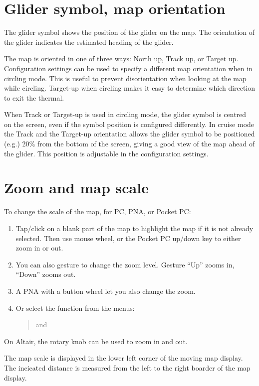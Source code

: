 \section{Glider symbol, map orientation}
The glider symbol shows the position of the glider on the map.  The
orientation of the glider indicates the estimated heading of the
glider.

The map is oriented in one of three ways: North up,
Track up, or Target up.  Configuration settings  can be used
to specify a different map orientation when in circling mode. This is useful to prevent
disorientation when looking at the map while circling.  Target-up when
circling makes it easy to determine which direction to exit the
thermal.

When Track or Target-up is used in circling mode, the glider symbol is
centred on the screen, even if the symbol position is configured differently.
In cruise mode the Track and the Target-up orientation allows the glider
symbol to be positioned (e.g.) 20\% from the bottom of the screen, giving a good view of the
map ahead of the glider.  This position is adjustable in the configuration
 settings.

\section{Zoom and map scale}

To change the scale of the map, for PC, PNA, or Pocket PC:
\begin{enumerate}
\item Tap/click on a blank part of the map to highlight the map if it is not
already selected.
Then use mouse wheel, or the Pocket PC up/down key to either zoom
in or out.
\item You can also gesture to change the zoom level. Gesture 
``Up'' zooms in, ``Down'' zooms out.
\item A PNA with a button wheel let you also change the zoom. 
\item Or select the function from the menus:
\begin{quote}
\blink{} and \blink{}
\end{quote}
\end{enumerate}
On Altair, the rotary knob can be used to zoom in and out.

The map scale is displayed in the lower left corner of the moving map
display. The incicated distance is measured from the left to the right boarder
of the map display.

